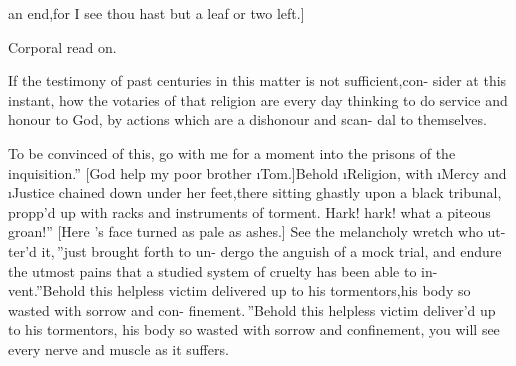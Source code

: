 \documentclass[twoside]{article}
\begin{document}
\break
an end,\tsk for I see thou hast but a leaf\break
or two left.]

\vspace\parskip
\centerline{Corporal \trim read on.}

\lqq If the testimony of past centuries\break
\lqq in this matter is not sufficient,\tsk con-\break
\lqq sider at this instant, how the votaries\break
\lqq of that religion are every day thinking\break
\lqq to do service and honour to God, by\break
\lqq actions which are a dishonour and scan-\break
\lqq dal to themselves.

\lqq To be convinced of this, go with\break
\lqq me for a moment into the prisons of\break
\lqq the inquisition.” [God help my poor\break
brother \i{Tom}.]\tsk \lqq Behold \i{Religion},
with
\lqq \i{Mercy} and \i{Justice} chained down under\break
\lqq her feet,\tsh there sitting ghastly upon\break
\lqq a black tribunal, propp’d up with racks\break
\lqq and instruments of torment. Hark!\break
\lqq \tsk hark!  what a piteous groan!” [Here\break
\trim's face turned as pale as ashes.]\break
\lqq See the melancholy wretch who ut-\break
\lqq ter’d it,\,” \lqq just brought forth to un-\break
\lqq dergo the anguish of a mock trial, and\break
\lqq endure the utmost pains that a studied\break
\lqq system of cruelty has been able to in-\break
\lqq vent.”\tsk \lqq Behold this helpless victim\break
\lqq delivered up to his tormentors,\tsk his\break
\lqq body so wasted with sorrow and con-\break
\lqq finement.\,”\tsh \lqq Behold this helpless\break
\lqq victim deliver’d up to his tormentors,\break
\lqq \tsk his body so wasted with sorrow and\break
\lqq confinement, you will see every nerve\break
\lqq and muscle as it suffers.
\end{document}
